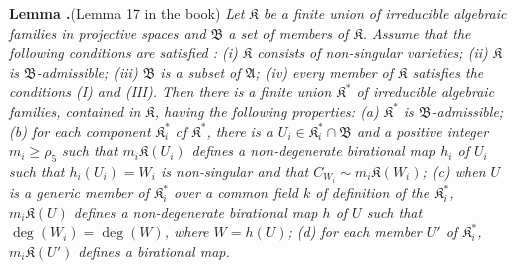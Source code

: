 \medskip
\noindent
{\bf Lemma .\label{art14-lem18}}(Lemma 17 in the book)
{\em Let $\mathfrak{K}$ be a finite union of irreducible algebraic families in projective spaces and $\mathfrak{B}$ a set of members of $\mathfrak{K}$. Assume that the following conditions are satisfied : {\rm(i)} $\mathfrak{K}$ consists of non-singular varieties; {\rm(ii)} $\mathfrak{K}$ is $\mathfrak{B}$-admissible; {\rm(iii)} $\mathfrak{B}$ is a subset of $\mathfrak{A}$; {\rm(iv)} every member of $\mathfrak{K}$ satisfies the conditions {\rm(I)} and {\rm(III)}. Then there is a finite union $\mathfrak{K}^{*}$ of irreducible algebraic families, contained in $\mathfrak{K}$, having the following properties: {\rm(a)} $\mathfrak{K}^{*}$ is $\mathfrak{B}$-admissible; {\rm(b)} for each component $\mathfrak{K}^{*}_{i}$ cf $\mathfrak{K}^{*}$, there is a $U_{i}\in \mathfrak{K}^{*}_{i}\cap \mathfrak{B}$ and a positive integer $m_{i}\geq \rho_{5}$ such that $m_{i}\mathfrak{K}(U_{i})$ defines a non-degenerate birational map $h_{i}$ of $U_{i}$ such that $h_{i}(U_{i})=W_{i}$ is non-singular and that $C_{W_{i}}\sim m_{i}\mathfrak{K}(W_{i})$; {\rm(c)} when $U$ is a generic member of $\mathfrak{K}^{*}_{i}$ over a common field $k$ of definition of the $\mathfrak{K}^{*}_{i}$, $m_{i}\mathfrak{K}(U)$ defines a non-degenerate birational map $h$ of $U$ such that $\deg(W_{i})=\deg(W)$, where $W=h(U)$; {\rm(d)} for each member $U'$ of $\mathfrak{K}^{*}_{i}$, $m_{i}\mathfrak{K}(U')$ defines a birational map.}


